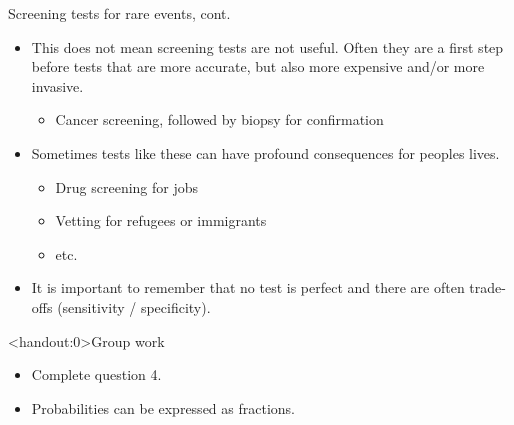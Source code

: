 \documentclass[xcolor=table]{beamer}
\begin{document}
\begin{frame}{Screening tests for rare events, cont.}
\begin{block}{}
\begin{itemize}
\item This does not mean screening tests are not useful. Often they are a first step before tests that are more accurate, but also more expensive and/or more invasive.
\begin{itemize}
\item Cancer screening, followed by biopsy for confirmation
\end{itemize}

\pause
\item Sometimes tests like these can have profound consequences for peoples lives.
\begin{itemize}
\item Drug screening for jobs
\item Vetting for refugees or immigrants 
\item etc.
\end{itemize}

\pause
\item It is important to remember that no test is perfect and there are often trade-offs (sensitivity / specificity).
\end{itemize}
\end{block}
\end{frame}

\begin{frame}<handout:0>{Group work}
\begin{block}{}
\large
\begin{itemize}
\item Complete question 4.
\item Probabilities can be expressed as fractions.
\end{itemize}
\end{block}
\end{frame}
\end{document}
